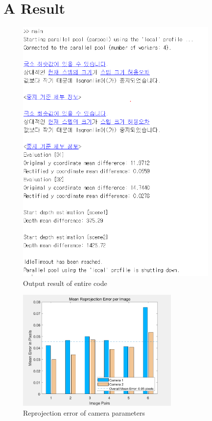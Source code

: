 \pagebreak
\section*{A Result}

\begin{figure}[h]
    \centering
    \includegraphics[width=10cm]{result1.png}
    \caption{Output result of entire code}
    \label{fig:result1}
\end{figure}

\pagebreak
\begin{figure}[h]
    \centering
    \includegraphics[width=8cm]{result2.png}
    \caption{Reprojection error of camera parameters}
    \label{fig:result1}
\end{figure}

